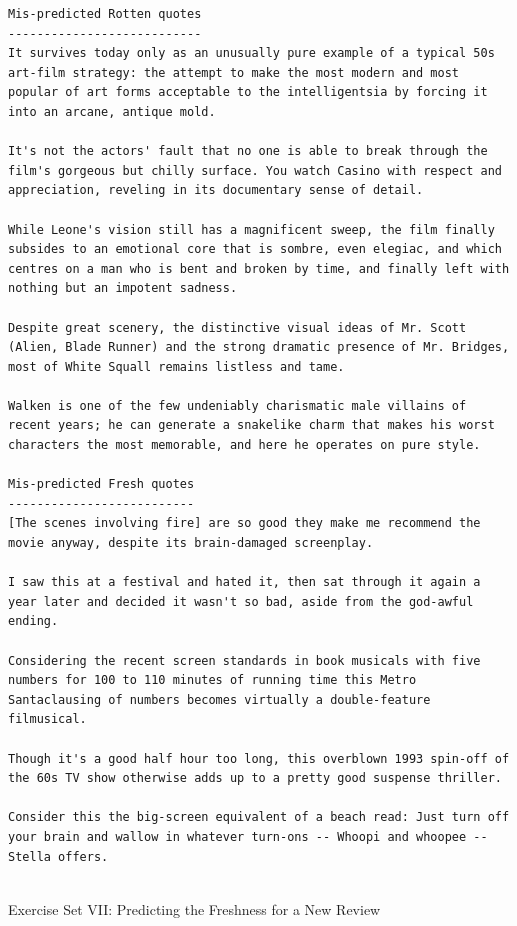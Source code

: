 \documentclass[11pt]{article}
\begin{document}
    \begin{Verbatim}[commandchars=\\\{\}]
Mis-predicted Rotten quotes
---------------------------
It survives today only as an unusually pure example of a typical 50s art-film strategy: the attempt to make the most modern and most popular of art forms acceptable to the intelligentsia by forcing it into an arcane, antique mold.

It's not the actors' fault that no one is able to break through the film's gorgeous but chilly surface. You watch Casino with respect and appreciation, reveling in its documentary sense of detail.

While Leone's vision still has a magnificent sweep, the film finally subsides to an emotional core that is sombre, even elegiac, and which centres on a man who is bent and broken by time, and finally left with nothing but an impotent sadness.

Despite great scenery, the distinctive visual ideas of Mr. Scott (Alien, Blade Runner) and the strong dramatic presence of Mr. Bridges, most of White Squall remains listless and tame.

Walken is one of the few undeniably charismatic male villains of recent years; he can generate a snakelike charm that makes his worst characters the most memorable, and here he operates on pure style.

Mis-predicted Fresh quotes
--------------------------
[The scenes involving fire] are so good they make me recommend the movie anyway, despite its brain-damaged screenplay.

I saw this at a festival and hated it, then sat through it again a year later and decided it wasn't so bad, aside from the god-awful ending.

Considering the recent screen standards in book musicals with five numbers for 100 to 110 minutes of running time this Metro Santaclausing of numbers becomes virtually a double-feature filmusical.

Though it's a good half hour too long, this overblown 1993 spin-off of the 60s TV show otherwise adds up to a pretty good suspense thriller.

Consider this the big-screen equivalent of a beach read: Just turn off your brain and wallow in whatever turn-ons -- Whoopi and whoopee -- Stella offers.


    \end{Verbatim}

    Exercise Set VII: Predicting the Freshness for a New Review
\end{document}
